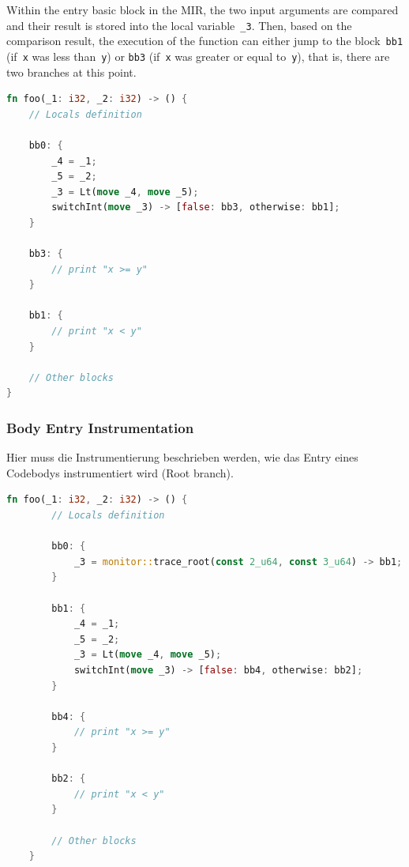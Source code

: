 \documentclass{article}
\begin{document}
Within the entry basic block in the \ac{MIR}, the two input arguments are compared and their result is stored into the local variable~\lstinline{_3}. Then, based on the comparison result, the execution of the function can either jump to the block~\lstinline{bb1} (if~\lstinline{x} was less than~\lstinline{y}) or \lstinline{bb3} (if~\lstinline{x} was greater or equal to~\lstinline{y}), that is, there are two branches at this point.
\begin{lstlisting}[language=Rust, style=boxed, caption={MIR of the \lstinline{foo} function}, label=lst:mir-of-example-function-to-instrument]
fn foo(_1: i32, _2: i32) -> () {
    // Locals definition

    bb0: {
        _4 = _1;
        _5 = _2;
        _3 = Lt(move _4, move _5);
        switchInt(move _3) -> [false: bb3, otherwise: bb1];
    }

    bb3: {
        // print "x >= y"
    }

    bb1: {
        // print "x < y"
    }

    // Other blocks
}
\end{lstlisting}

\subsubsection{Body Entry Instrumentation}
Hier muss die Instrumentierung beschrieben werden, wie das Entry eines Codebodys instrumentiert wird (Root branch).

\begin{lstlisting}[language=Rust, style=boxed, caption={Instrumented entry in the MIR of the \lstinline{foo} function}, label=lst:mir-instrument-root]
    fn foo(_1: i32, _2: i32) -> () {
        // Locals definition

        bb0: {
            _3 = monitor::trace_root(const 2_u64, const 3_u64) -> bb1;
        }

        bb1: {
            _4 = _1;
            _5 = _2;
            _3 = Lt(move _4, move _5);
            switchInt(move _3) -> [false: bb4, otherwise: bb2];
        }

        bb4: {
            // print "x >= y"
        }

        bb2: {
            // print "x < y"
        }

        // Other blocks
    }
    \end{lstlisting}
\end{document}
